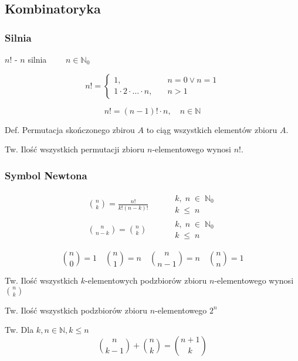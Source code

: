 \documentclass[../Matematyka.tex]{subfiles}
\begin{document}
    \subsection{Kombinatoryka}

    \subsubsection{Silnia}
    \(n!\) - \(n\) silnia \(\qquad n \in \mathbb{N}_0\)

    \begin{displaymath}
        n! =
        \begin{cases}
            1, & \quad n = 0 \lor n = 1 \\
            1 \cdot 2 \cdot \ldots \cdot n, & \quad n > 1
        \end{cases}
    \end{displaymath}

    \[n! = (n - 1)! \cdot n, \quad n \in \mathbb{N}\]

    Def. Permutacja skończonego zbirou \(A\) to ciąg wszystkich elementów zbioru \(A\).\par
    Tw. Ilość wszystkich permutacji zbioru \(n\)-elementowego wynosi \(n!\).

    \subsubsection{Symbol Newtona}

    \begin{align*}
        \binom{n}{k} = 
        \frac{n!}{k!(n-k)!} \qquad&
        \substack{
            k,\;n\;\in\;\mathbb{N}_0 \\
            k\;\leq\;n
        }\\
        \binom{n}{n-k} = 
        \binom{n}{k} \qquad&
        \substack{
            k,\;n\;\in\;\mathbb{N}_0 \\
            k\;\leq\;n
        }
    \end{align*}

    \begin{displaymath}
        \binom{n}{0} = 1 \quad
        \binom{n}{1} = n \quad
        \binom{n}{n - 1} = n \quad
        \binom{n}{n} = 1
    \end{displaymath}

    Tw. Ilość wszystkich \(k\)-elementowych podzbiorów zbioru \(n\)-elementowego wynosi \(\binom{n}{k}\)\par
    Tw. Ilość wszystkich podzbiorów zbioru \(n\)-elementowego \(2^n\)\par
    Tw. Dla \(k, n \in \mathbb{N}, k \leq n\)
    \begin{displaymath}
        \binom{n}{k-1}+
        \binom{n}{k} = 
        \binom{n+1}{k}
    \end{displaymath}
\end{document}
